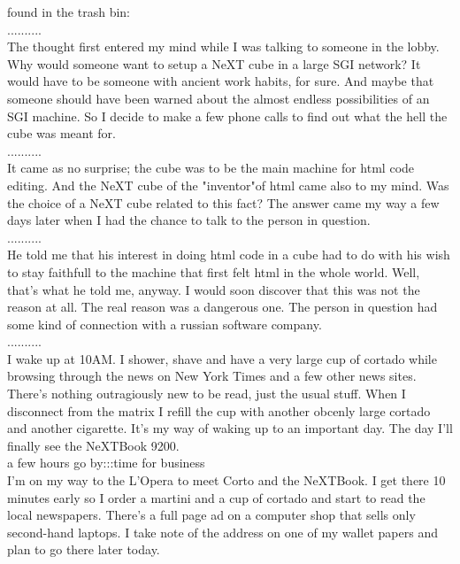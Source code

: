 \documentclass[11pt,twoside,a4paper]{book}
\begin{document}
\begin{multicols*}{2}
{\small found in the trash bin:} ~\\
	.......... ~\\
    The thought first entered my mind while I was talking to someone in the lobby. Why would someone want to setup a NeXT cube in a large SGI network? It would have to be someone with ancient work habits, for sure. And maybe that someone should have been warned about the almost endless possibilities of an SGI machine. So I decide to make a few phone calls to find out what the hell the cube was meant for. ~\\
	.......... ~\\
    It came as no surprise; the cube was to be the main machine for html code editing. And the NeXT cube of the "inventor"of html came also to my mind. Was the choice of a NeXT cube related to this fact? The answer came my way a few days later when I had the chance to talk to the person in question. ~\\
	.......... ~\\
    He told me that his interest in doing html code in a cube had to do with his wish to stay faithfull to the machine that first felt html in the whole world. Well, that's what he told me, anyway. I would soon discover that this was not the reason at all. The real reason was a dangerous one. The person in question had some kind of connection with a russian software company. ~\\
	.......... ~\\

I wake up at 10AM. I shower, shave and have a very large cup of cortado while browsing through the news on New York Times and a few other news sites. There's nothing outragiously new to be read, just the usual stuff. When I disconnect from the matrix I refill the cup with another obcenly large cortado and another cigarette. It's my way of waking up to an important day. The day I'll finally see the NeXTBook 9200. ~\\

{\large a few hours go by:::time for business} ~\\

I'm on my way to the L'Opera to meet Corto and the NeXTBook. I get there 10 minutes early so I order a martini and a cup of cortado and start to read the local newspapers. There's a full page ad on a computer shop that sells only second-hand laptops. I take note of the address on one of my wallet papers and plan to go there later today. ~\\


\end{multicols*}
\end{document}
